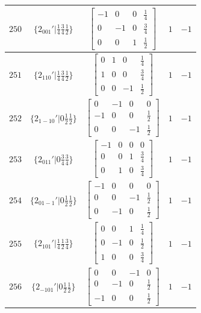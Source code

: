 \documentclass[fleqn,8pt]{jsarticle}
\begin{document}
\begin{longtable}{ccccc}
$ 250 $ & $ \{2{}_{001}{}'|\frac{1}{4} \frac{3}{4} \frac{1}{2}\} $ & $ \begin{bmatrix} -1 & 0 & 0 & \frac{1}{4} \\ 0 & -1 & 0 & \frac{3}{4} \\ 0 & 0 & 1 & \frac{1}{2} \end{bmatrix} $ & $ 1 $ & $ -1 $ \\ \hline
$ 251 $ & $ \{2{}_{110}{}'|\frac{1}{4} \frac{3}{4} \frac{1}{2}\} $ & $ \begin{bmatrix} 0 & 1 & 0 & \frac{1}{4} \\ 1 & 0 & 0 & \frac{3}{4} \\ 0 & 0 & -1 & \frac{1}{2} \end{bmatrix} $ & $ 1 $ & $ -1 $ \\ \hline
$ 252 $ & $ \{2{}_{1-10}{}'|0 \frac{1}{2} \frac{1}{2}\} $ & $ \begin{bmatrix} 0 & -1 & 0 & 0 \\ -1 & 0 & 0 & \frac{1}{2} \\ 0 & 0 & -1 & \frac{1}{2} \end{bmatrix} $ & $ 1 $ & $ -1 $ \\ \hline
$ 253 $ & $ \{2{}_{011}{}'|0 \frac{3}{4} \frac{3}{4}\} $ & $ \begin{bmatrix} -1 & 0 & 0 & 0 \\ 0 & 0 & 1 & \frac{3}{4} \\ 0 & 1 & 0 & \frac{3}{4} \end{bmatrix} $ & $ 1 $ & $ -1 $ \\ \hline
$ 254 $ & $ \{2{}_{01-1}{}'|0 \frac{1}{2} \frac{1}{2}\} $ & $ \begin{bmatrix} -1 & 0 & 0 & 0 \\ 0 & 0 & -1 & \frac{1}{2} \\ 0 & -1 & 0 & \frac{1}{2} \end{bmatrix} $ & $ 1 $ & $ -1 $ \\ \hline
$ 255 $ & $ \{2{}_{101}{}'|\frac{1}{4} \frac{1}{2} \frac{3}{4}\} $ & $ \begin{bmatrix} 0 & 0 & 1 & \frac{1}{4} \\ 0 & -1 & 0 & \frac{1}{2} \\ 1 & 0 & 0 & \frac{3}{4} \end{bmatrix} $ & $ 1 $ & $ -1 $ \\ \hline
$ 256 $ & $ \{2{}_{-101}{}'|0 \frac{1}{2} \frac{1}{2}\} $ & $ \begin{bmatrix} 0 & 0 & -1 & 0 \\ 0 & -1 & 0 & \frac{1}{2} \\ -1 & 0 & 0 & \frac{1}{2} \end{bmatrix} $ & $ 1 $ & $ -1 $ \\ \hline

\end{longtable}
\end{document}
